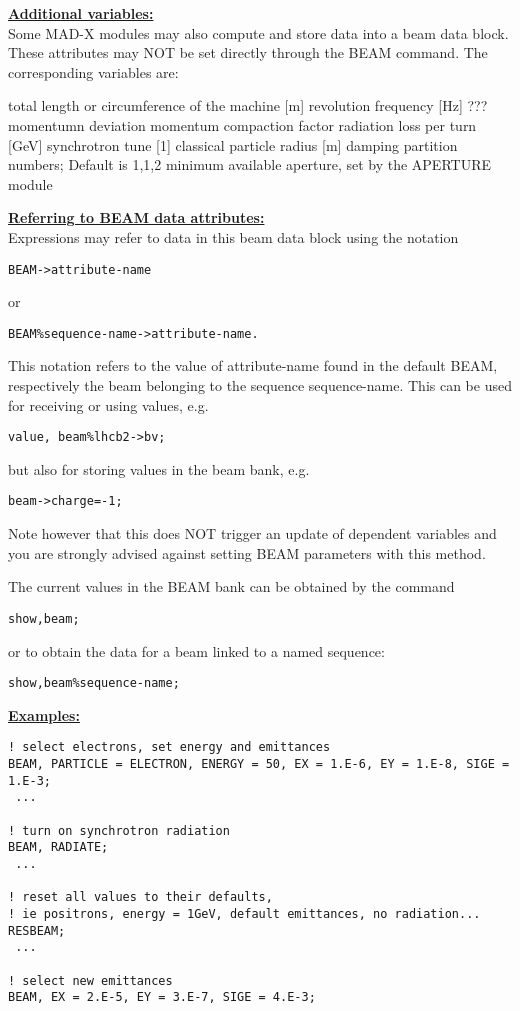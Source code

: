 {\bf \underline{Additional variables:}}\\ 
Some MAD-X modules may also compute and store data into a beam data 
block. These attributes may NOT be set directly through the BEAM
command. The corresponding variables are:  
\begin{madlist}
   total length or circumference of the machine [m]
   revolution frequency [Hz]
   ???
   momentumn deviation
   momentum compaction factor
   radiation loss per turn [GeV]
   synchrotron tune [1]
   classical particle radius [m]
   damping partition numbers; Default is {1,1,2}
   minimum available aperture, set by the APERTURE module
\end{madlist}


{\bf \underline{Referring to BEAM data attributes:}}\\ 
Expressions may refer to data in this beam data block using the
notation  
\begin{verbatim}
BEAM->attribute-name
\end{verbatim} 
or 
\begin{verbatim}
BEAM%sequence-name->attribute-name.
\end{verbatim} 

This notation refers to the value of attribute-name found in the default
BEAM, respectively the beam belonging to the sequence sequence-name. 
This can be used for receiving or using values, e.g. 
\begin{verbatim}
value, beam%lhcb2->bv;
\end{verbatim} 
but also for storing values in the beam bank, e.g.  
\begin{verbatim}
beam->charge=-1;
\end{verbatim} 
Note however that this does NOT trigger an update of dependent variables
and you are strongly advised against setting BEAM parameters with this method.

The current values in the BEAM bank can be obtained by the command
\begin{verbatim}
show,beam;
\end{verbatim}
or to obtain the data for a beam linked to a named sequence:
\begin{verbatim}
show,beam%sequence-name;
\end{verbatim}

{\bf \underline{Examples:}}\\ 
\begin{verbatim}
! select electrons, set energy and emittances
BEAM, PARTICLE = ELECTRON, ENERGY = 50, EX = 1.E-6, EY = 1.E-8, SIGE = 1.E-3;
 ...

! turn on synchrotron radiation
BEAM, RADIATE;
 ...

! reset all values to their defaults, 
! ie positrons, energy = 1GeV, default emittances, no radiation...
RESBEAM;
 ...

! select new emittances
BEAM, EX = 2.E-5, EY = 3.E-7, SIGE = 4.E-3;
\end{verbatim} 


